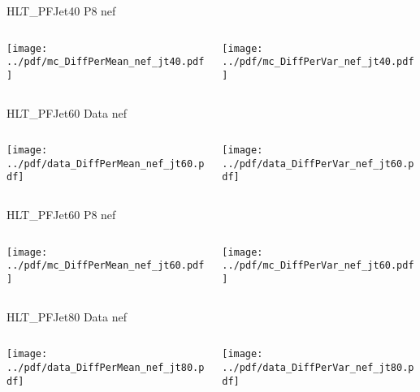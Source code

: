 \documentclass[9pt]{beamer}
\begin{document}
\begin{frame}[t]{HLT\_PFJet40 P8 nef}
\begin{columns}[T]
  \begin{column}{.5\textwidth}
  \texttt{[image: ../pdf/mc\_DiffPerMean\_nef\_jt40.pdf]}
  \end{column}
  \begin{column}{.5\textwidth}
  \texttt{[image: ../pdf/mc\_DiffPerVar\_nef\_jt40.pdf]}
  \end{column}
\end{columns}
\end{frame}

\begin{frame}[t]{HLT\_PFJet60 Data nef}
\begin{columns}[T]
  \begin{column}{.5\textwidth}
  \texttt{[image: ../pdf/data\_DiffPerMean\_nef\_jt60.pdf]}
  \end{column}
  \begin{column}{.5\textwidth}
  \texttt{[image: ../pdf/data\_DiffPerVar\_nef\_jt60.pdf]}
  \end{column}
\end{columns}
\end{frame}

\begin{frame}[t]{HLT\_PFJet60 P8 nef}
\begin{columns}[T]
  \begin{column}{.5\textwidth}
  \texttt{[image: ../pdf/mc\_DiffPerMean\_nef\_jt60.pdf]}
  \end{column}
  \begin{column}{.5\textwidth}
  \texttt{[image: ../pdf/mc\_DiffPerVar\_nef\_jt60.pdf]}
  \end{column}
\end{columns}
\end{frame}

\begin{frame}[t]{HLT\_PFJet80 Data nef}
\begin{columns}[T]
  \begin{column}{.5\textwidth}
  \texttt{[image: ../pdf/data\_DiffPerMean\_nef\_jt80.pdf]}
  \end{column}
  \begin{column}{.5\textwidth}
  \texttt{[image: ../pdf/data\_DiffPerVar\_nef\_jt80.pdf]}
  \end{column}
\end{columns}
\end{frame}
\end{document}
